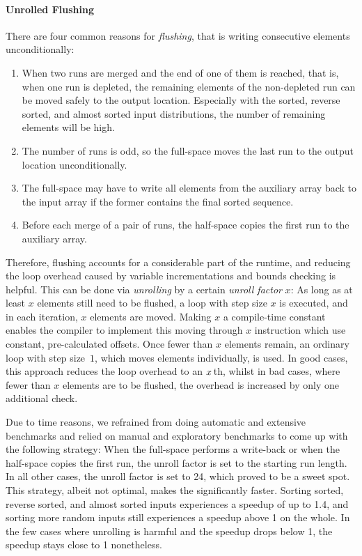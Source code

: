 \paragraph{Unrolled Flushing}
There are four common reasons for \emph{flushing}, that is writing consecutive elements unconditionally:
\begin{enumerate}
	\item
	When two runs are merged and the end of one of them is reached, that is, when one run is depleted, the remaining elements of the non-depleted run can be moved safely to the output location.
	Especially with the sorted, reverse sorted, and almost sorted input distributions, the number of remaining elements will be high.

	\item
	The number of runs is odd, so the full-space \MS{} moves the last run to the output location unconditionally.

	\item
	The full-space \MS{} may have to write all elements from the auxiliary array back to the input array if the former contains the final sorted sequence.

	\item
	Before each merge of a pair of runs, the half-space \MS{} copies the first run to the auxiliary array.
\end{enumerate}
Therefore, flushing accounts for a considerable part of the runtime, and reducing the loop overhead caused by variable incrementations and bounds checking is helpful.
This can be done via \emph{unrolling} by a certain \emph{unroll factor} \(x\):
As long as at least \(x\) elements still need to be flushed, a loop with step size \(x\) is executed, and in each iteration, \(x\) elements are moved.
Making \(x\) a compile-time constant enables the compiler to implement this moving through \(x\) instruction which use constant, pre-calculated offsets.
Once fewer than \(x\) elements remain, an ordinary loop with step size~\(1\), which moves elements individually, is used.
In good cases, this approach reduces the loop overhead to an \(x\kern .125em\)th, whilst in bad cases, where fewer than \(x\) elements are to be flushed, the overhead is increased by only one additional check.

Due to time reasons, we refrained from doing automatic and extensive benchmarks and relied on manual and exploratory benchmarks to come up with the following strategy:
When the full-space \MS{} performs a write-back or when the half-space \MS{} copies the first run, the unroll factor is set to the starting run length.
In all other cases, the unroll factor is set to 24, which proved to be a sweet spot.
This strategy, albeit not optimal, makes the \MS*{} significantly faster.
Sorting sorted, reverse sorted, and almost sorted inputs experiences a speedup of up to \num{1.4}, and sorting more random inputs still experiences a speedup above \num{1} on the whole.
In the few cases where unrolling is harmful and the speedup drops below \num{1}, the speedup stays close to \num{1} nonetheless.


